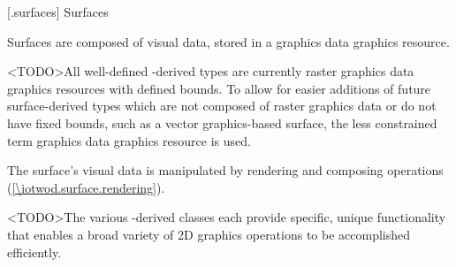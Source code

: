 
 [\iotwod.surfaces] {Surfaces}

\pnum
Surfaces are composed of visual data, stored in a graphics data graphics resource.
\begin{note}
<TODO>All well-defined -derived types are currently raster graphics data graphics resources with defined bounds. To allow for easier additions of future surface-derived types which are not composed of raster graphics data or do not have fixed bounds, such as a vector graphics-based surface, the less constrained term graphics data graphics resource is used.
\end{note}

\pnum
The surface's visual data is manipulated by rendering and composing operations (\ref{\iotwod.surface.rendering}).

\pnum
<TODO>The various -derived classes each provide specific, unique functionality that enables a broad variety of 2D graphics operations to be accomplished efficiently.

\addtocounter{SectionDepthBase}{1}






\addtocounter{SectionDepthBase}{-1}

